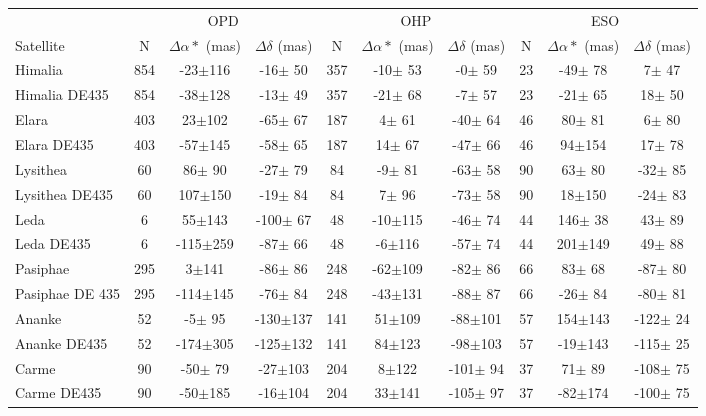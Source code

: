 \documentclass[11pt,a4paper]{report}
\author{Altair Ramos}
\begin{document}
\begin{landscape}

\begin{table*}
\begin{centering}
\begin{tabular}{l|ccc|ccc|ccc}
\hline  \hline
 & \multicolumn{3}{|c|}{OPD} & \multicolumn{3}{|c|}{OHP} & \multicolumn{3}{|c}{ESO}\tabularnewline
Satellite  & N & $\Delta\alpha*$ (mas) & $\Delta\delta$ (mas) & N & $\Delta\alpha*$ (mas) & $\Delta\delta$ (mas) & N & $\Delta\alpha*$ (mas) & $\Delta\delta$ (mas) \tabularnewline
\hline
Himalia  & 854 & -23$\pm$116 & -16$\pm$ 50 & 357 & -10$\pm$ 53 &  -0$\pm$ 59 & 23 & -49$\pm$ 78 &   7$\pm$ 47 \tabularnewline
Himalia DE435 & 854 & -38$\pm$128 & -13$\pm$ 49 & 357 & -21$\pm$ 68 &  -7$\pm$ 57 & 23 & -21$\pm$ 65 &  18$\pm$ 50 \tabularnewline
\hdashline
Elara  & 403 &  23$\pm$102 & -65$\pm$ 67 & 187 &   4$\pm$ 61 & -40$\pm$ 64 & 46 &  80$\pm$ 81 &   6$\pm$ 80 \tabularnewline
Elara DE435 & 403 & -57$\pm$145 & -58$\pm$ 65 & 187 &  14$\pm$ 67 & -47$\pm$ 66 & 46 &  94$\pm$154 &  17$\pm$ 78 \tabularnewline
\hdashline
Lysithea & 60 &  86$\pm$ 90 & -27$\pm$ 79 & 84 &  -9$\pm$ 81 & -63$\pm$ 58 & 90 &  63$\pm$ 80 & -32$\pm$ 85 \tabularnewline
Lysithea DE435 & 60 & 107$\pm$150 & -19$\pm$ 84 & 84 &   7$\pm$ 96 & -73$\pm$ 58 & 90 &  18$\pm$150 & -24$\pm$ 83 \tabularnewline
\hdashline
Leda  & 6 &  55$\pm$143 & -100$\pm$ 67 & 48 & -10$\pm$115 & -46$\pm$ 74 & 44 & 146$\pm$ 38 &  43$\pm$ 89 \tabularnewline
Leda DE435 & 6 & -115$\pm$259 & -87$\pm$ 66 & 48 &  -6$\pm$116 & -57$\pm$ 74 & 44 & 201$\pm$149 &  49$\pm$ 88 \tabularnewline
\hdashline
Pasiphae  & 295 &   3$\pm$141 & -86$\pm$ 86 & 248 & -62$\pm$109 & -82$\pm$ 86 & 66 &  83$\pm$ 68 & -87$\pm$ 80 \tabularnewline
Pasiphae DE 435 & 295 & -114$\pm$145 & -76$\pm$ 84 & 248 & -43$\pm$131 & -88$\pm$ 87 & 66 & -26$\pm$ 84 & -80$\pm$ 81 \tabularnewline
\hdashline
Ananke  & 52 &  -5$\pm$ 95 & -130$\pm$137 & 141 &  51$\pm$109 & -88$\pm$101  & 57 & 154$\pm$143 & -122$\pm$ 24 \tabularnewline
Ananke DE435 & 52 & -174$\pm$305 & -125$\pm$132 & 141 &  84$\pm$123 & -98$\pm$103 & 57 & -19$\pm$143 & -115$\pm$ 25 \tabularnewline
\hdashline
Carme  & 90 & -50$\pm$ 79 & -27$\pm$103 &  204 &   8$\pm$122 & -101$\pm$ 94 & 37 &  71$\pm$ 89 & -108$\pm$ 75 \tabularnewline
Carme DE435 & 90 & -50$\pm$185 & -16$\pm$104 & 204 &  33$\pm$141 & -105$\pm$ 97 & 37 & -82$\pm$174 & -100$\pm$ 75 \tabularnewline

\end{tabular}
\end{centering}
\end{table*}
\end{landscape}
\end{document}
